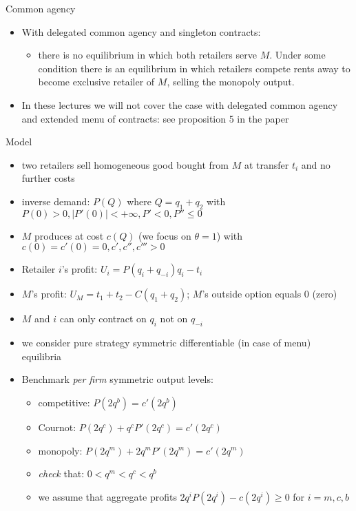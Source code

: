 \documentclass[11pt,english]{beamer}
\begin{document}
\begin{frame}[allowframebreaks]{Common agency}
\begin{itemize}
\begin{itemize}
    contracts at all $=>$ MS03 section 5 presents a model with asymmetric
    information about $M$'s efficiency. Then a contract is offered for
    each type of $M$ and extended contracts make sense
  \end{itemize}
\item With delegated common agency and singleton contracts:
  \begin{itemize}
  \item there is no equilibrium in which both retailers serve
    $M$. Under some condition there is an equilibrium in which
    retailers compete rents away to become exclusive retailer of $M$,
    selling the monopoly output.
  \end{itemize}
\item In these lectures we will not cover the case with delegated
  common agency and extended menu of contracts: see proposition 5 in
  the paper
\end{itemize}
\end{frame}

\begin{frame}[allowframebreaks]{Model}
  \begin{itemize}
  \item two retailers sell homogeneous good bought from $M$ at
    transfer $t_i$ and no further costs
  \item inverse demand: $P(Q)$ where $Q=q_1+q_2$ with $P(0)>0,|P'(0)|<+\infty,P'<0,P''\leq0$
  \item $M$ produces at cost $c(Q)$ (we focus on $\theta=1$) with $c(0)=c'(0)=0,c',c'',c'''>0$
  \item Retailer $i$'s profit: $U_i = P(q_i+q_{-i})q_i -t_i$
  \item $M$'s profit: $U_M = t_1+t_2-C(q_1+q_2)$; $M$'s outside option
    equals 0 (zero)
  \item $M$ and $i$ can only contract on $q_i$ not on $q_{-i}$
  \item we consider pure strategy symmetric differentiable (in case of
    menu) equilibria

\newpage

  \item Benchmark \emph{per firm} symmetric output levels:
    \begin{itemize}
    \item competitive: $P(2q^b)=c'(2q^b)$
    \item Cournot: $P(2q^c)+q^cP'(2q^c)=c'(2q^c)$
    \item monopoly: $P(2q^m)+2q^mP'(2q^m)=c'(2q^m)$
    \item \emph{check} that: $0<q^m<q^c<q^b$
    \item we assume that aggregate profits $2q^iP(2q^i) -c(2q^i) \geq
      0$ for $i=m,c,b$
    \end{itemize}
  \end{itemize}
\end{frame}
\end{document}
